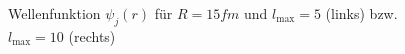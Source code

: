 \begin{figure}[htbp]
  \centering
  \caption{Wellenfunktion $\psi_j(r)$ für $R = \unit{15}{fm}$ und
    $l_{\max} = 5$ (links) bzw. $l_{\max} = 10$ (rechts)}
  \label{img.psi-var-5}
\end{figure}

